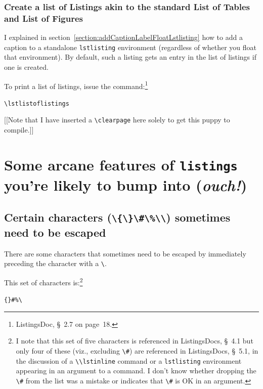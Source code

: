 \documentclass[12pt,table,final]{article}%
\DeclareRobustCommand{\escapableCharactersJdrLst}{\lstinline|\{\}\#\%\\|\xspace}
\begin{document}
\subsubsection{Create a list of Listings akin to the standard List of Tables and List of Figures}
I explained in section~\ref{section:addCaptionLabelFloatLstlisting} how to add a caption to a standalone \lstinline|lstlisting| environment (regardless of whether you float that environment). By default, such a listing gets an entry in the list of listings if one is created.

To print a list of listings, issue the command:\footnote{ListingsDoc, §~2.7 on page~18.}
\begin{jdrCodeSnip}
\lstinline|\lstlistoflistings|
\end{jdrCodeSnip}

\FloatBarrier

[[Note that I have inserted a \lstinline|\clearpage| here solely to get this puppy to compile.]]
\clearpage%

\section{Some arcane features of \lstinline|listings| you’re likely to bump into (\emph{ouch!})}
\label{section:arcaneFeaturesListings}
\subsection{Certain characters (\escapableCharactersJdrLst) sometimes need to be escaped}
\label{section:escapingCharactersSometimes}
There are some characters that sometimes need to be escaped by immediately preceding the character with a \lstinline$\$.

This set of characters is:\footnote{I note that this set of five characters is referenced in ListingsDocs, §~4.1 but only four of these (viz., excluding \lstinline|\#|) are referenced in ListingsDocs, §~5.1, in the discussion of a \lstinline|\\lstinline| command or a \lstinline|lstlisting| environment appearing in an argument to a command. I don't know whether dropping the \lstinline|\#| from the list was a mistake or indicates that \lstinline|\#| is OK in an argument.}
\begin{jdrCodeSnip}
\label{codeeq:verbotenCharactersInVerbatimCodeInArguments}
\lstinline|{}#%\|
\end{jdrCodeSnip}
\end{document}
